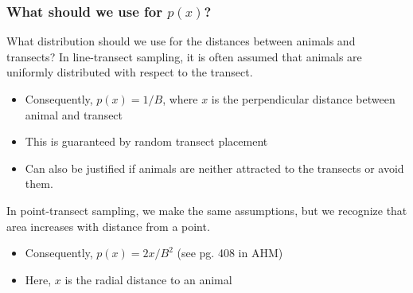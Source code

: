\documentclass[color=usenames,dvipsnames]{beamer}\usepackage[]{graphicx}\usepackage[]{color}
\begin{document}
\begin{frame}
  \frametitle{What should we use for $p(x)$?}
  What distribution should we use for the distances between animals
  and transects?
  \pause
  \vfill
  In \alert{line-transect sampling}, it is often assumed that animals
  are uniformly distributed with respect to the transect.
  \begin{itemize}
    \item Consequently, $p(x) = 1/B$, where $x$ is the
      \alert{perpendicular} distance between animal and transect
    \item This is guaranteed by random transect placement
    \item Can also be justified if animals are neither attracted to
      the transects or avoid them. 
  \end{itemize}
  \pause
  \vfill
  In \alert{point-transect sampling}, we make the same assumptions,
  but we recognize that area increases with distance from a point.
  \begin{itemize}
    \item Consequently, $p(x) = 2x/B^2$ (see pg. 408 in AHM)
    \item Here, $x$ is the \alert{radial} distance to an animal
  \end{itemize}
\end{frame}
\end{document}
